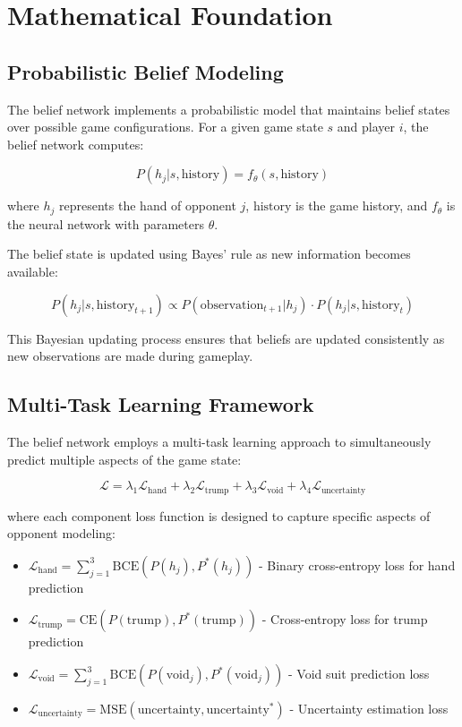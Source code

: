 \documentclass[conference]{IEEEtran}
\begin{document}
\section{Mathematical Foundation}

\subsection{Probabilistic Belief Modeling}

The belief network implements a probabilistic model that maintains belief states over possible game configurations. For a given game state $s$ and player $i$, the belief network computes:

\begin{equation}
P(h_j|s, \text{history}) = f_\theta(s, \text{history})
\end{equation}

where $h_j$ represents the hand of opponent $j$, $\text{history}$ is the game history, and $f_\theta$ is the neural network with parameters $\theta$.

The belief state is updated using Bayes' rule as new information becomes available:

\begin{equation}
P(h_j|s, \text{history}_{t+1}) \propto P(\text{observation}_{t+1}|h_j) \cdot P(h_j|s, \text{history}_t)
\end{equation}

This Bayesian updating process ensures that beliefs are updated consistently as new observations are made during gameplay.

\subsection{Multi-Task Learning Framework}

The belief network employs a multi-task learning approach to simultaneously predict multiple aspects of the game state:

\begin{equation}
\mathcal{L} = \lambda_1 \mathcal{L}_{\text{hand}} + \lambda_2 \mathcal{L}_{\text{trump}} + \lambda_3 \mathcal{L}_{\text{void}} + \lambda_4 \mathcal{L}_{\text{uncertainty}}
\end{equation}

where each component loss function is designed to capture specific aspects of opponent modeling:

\begin{itemize}
    \item $\mathcal{L}_{\text{hand}} = \sum_{j=1}^3 \text{BCE}(P(h_j), P^*(h_j))$ - Binary cross-entropy loss for hand prediction
    \item $\mathcal{L}_{\text{trump}} = \text{CE}(P(\text{trump}), P^*(\text{trump}))$ - Cross-entropy loss for trump prediction
    \item $\mathcal{L}_{\text{void}} = \sum_{j=1}^3 \text{BCE}(P(\text{void}_j), P^*(\text{void}_j))$ - Void suit prediction loss
    \item $\mathcal{L}_{\text{uncertainty}} = \text{MSE}(\text{uncertainty}, \text{uncertainty}^*)$ - Uncertainty estimation loss
\end{itemize}
\end{document}

